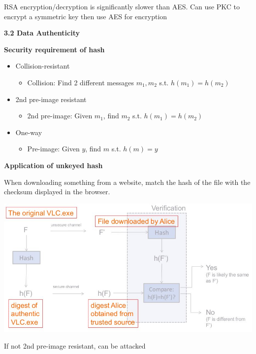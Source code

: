 \documentclass[landscape,a4paper]{extarticle}
\newenvironment{Figure}
  {\par\noindent\minipage{\linewidth}}
  {\endminipage\par\medskip}
\begin{document}
\begin{multicols*}{5}
    RSA encryption/decryption is significantly slower than AES. 
    Can use PKC to encrypt a symmetric key then use AES for encryption

    \textbf{3.2 Data Authenticity}

    \textbf{Security requirement of hash}

    \begin{itemize}
        \item Collision-resistant
        \begin{itemize}
            \item Collision: Find 2 different messages $m_1, m_2$ s.t. $h(m_1) = h(m_2)$
        \end{itemize}
        \item 2nd pre-image resistant
        \begin{itemize}
            \item 2nd pre-image: Given $m_1$, find $m_2$ s.t. $h(m_1) = h(m_2)$
        \end{itemize}
        \item One-way
        \begin{itemize}
            \item Pre-image: Given $y$, find $m$ s.t. $h(m) = y$
        \end{itemize}
    \end{itemize}

    \textbf{Application of unkeyed hash}

    When downloading something from a website, match the hash of the file with the checksum
    displayed in the browser.

    \begin{Figure}
        \centering
        \includegraphics[width=\linewidth]{hash_application_vlc.jpg}
    \end{Figure}

    If not 2nd pre-image resistant, can be attacked


\end{multicols*}
\end{document}
